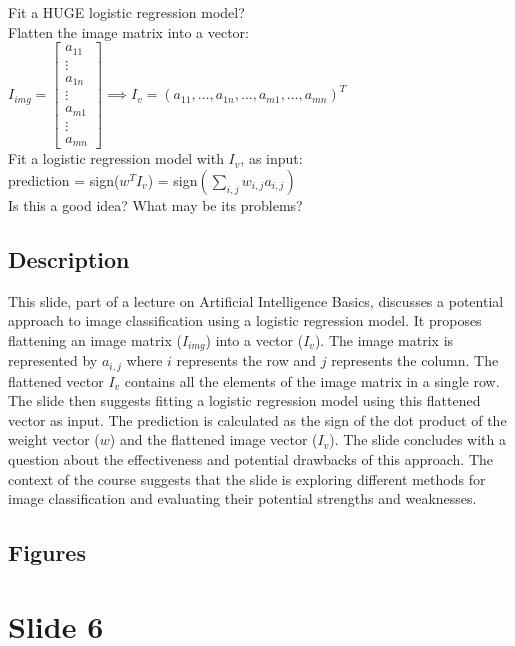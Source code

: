 \documentclass{article}%
\begin{document}
Fit a HUGE logistic regression model? \\
Flatten the image matrix into a vector: \\
$I_{img} = \begin{bmatrix} a_{11} \\ \vdots \\ a_{1n} \\ \vdots \\ a_{m1} \\ \vdots \\ a_{mn} \end{bmatrix} \implies I_v = (a_{11}, \dots, a_{1n}, \dots, a_{m1}, \dots, a_{mn})^T$ \\
Fit a logistic regression model with $I_v$, as input: \\
prediction = sign($w^T I_v$) = sign$(\sum_{i,j} w_{i,j} a_{i,j})$ \\
Is this a good idea? What may be its problems?
%
\subsection{Description}%
This slide, part of a lecture on Artificial Intelligence Basics, discusses a potential approach to image classification using a logistic regression model.  It proposes flattening an image matrix ($I_{img}$) into a vector ($I_v$).  The image matrix is represented by $a_{i,j}$ where $i$ represents the row and $j$ represents the column.  The flattened vector $I_v$ contains all the elements of the image matrix in a single row.  The slide then suggests fitting a logistic regression model using this flattened vector as input.  The prediction is calculated as the sign of the dot product of the weight vector ($w$) and the flattened image vector ($I_v$).  The slide concludes with a question about the effectiveness and potential drawbacks of this approach.  The context of the course suggests that the slide is exploring different methods for image classification and evaluating their potential strengths and weaknesses.%
\subsection{Figures}%
\begin{figure}[H]%
\centering%
\end{figure}

%
\newpage%
\section{Slide 6}%
\label{sec:Slide6}%
\end{document}
